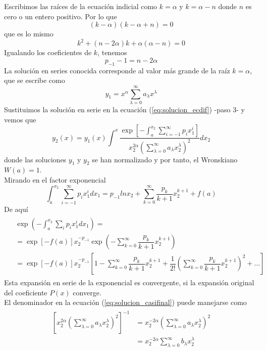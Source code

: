 Escribimos las raíces de la ecuación indicial como $k = \alpha$ y $k= \alpha -n$ donde $n$ es cero o un entero positivo. Por lo que
\begin{equation}
(k - \alpha)(k - \alpha + n) = 0
\end{equation}
que es lo mismo
\[ k^{2} + (n-2\alpha)k + \alpha(\alpha - n) = 0\]
Igualando los coeficientes de $k$, tenemos
\begin{equation}
p_{-1} -1 = n - 2 \alpha
\end{equation}
La solución en series conocida corresponde al valor más grande de la raíz $k=\alpha$, que se escribe como
\[ y_{1} =  x^{\alpha} \sum_{\lambda=0}^{\infty} a_{\lambda} x^{\lambda} \]
Sustituimos la solución en serie en la ecuación (\ref{eq:solucion_ecdif}) -paso 3- y vemos que
\begin{equation}
y_{2}(x) = y_{1} (x) \int^{x} \dfrac{\exp \left[ - \int_{a}^{x_{2}} \sum_{i=-1}^{\infty} p_{i} x^{i}_{1} \right] }{x_{2}^{2\alpha} \left( \sum_{\lambda=0}^\infty a_{\lambda} x_{2}^{\lambda} \right)^{2} } dx_{2} \label{eq:solucion_casifinal}
\end{equation}
donde las soluciones $y_{1}$ y $y_{2}$ se han normalizado y por tanto, el Wronskiano $W(a)=1$. 
\\
Mirando en el factor exponencial
\begin{equation}
\int_{a}^{x_{2}} \sum_{i=-1}^{\infty} p_{i} x_{1}^{i} dx_{1} = p_{-1} ln x_{2} + \sum_{k=0}^{\infty} \dfrac{p_{k}}{k+1} x_{2}^{k+1} + f(a)
\end{equation}
De aquí
\begin{eqnarray}
\begin{aligned}
&{}\exp \left( - \int_{a}^{x_{2}} \sum_{i} p_{i} x_{1}^{i} dx_{1} \right) = \\
&= \exp [ - f(a) ] x_{2}^{-p_{-1}} \exp \left( - \sum_{k=0}^{\infty} \dfrac{p_{k}}{k+1} x_{2}^{k+1} \right) \\
&= \exp [ - f(a) ] x_{2}^{-p_{-1}} \left[ 1 - \sum_{k=0}^{\infty} \dfrac{p_{k}}{k+1} x_{2}^{k+1} + \dfrac{1}{2!} \left( \sum_{k=0}^{\infty} \dfrac{p_{k}}{k+1} x_{2}^{k+1} \right)^{2} + \ldots \right]
\end{aligned}
\end{eqnarray}
Esta expansión en serie de la exponencial es convergente, si la expansión original del coeficiente $P(x)$ converge.
\\El denominador en la ecuación (\ref{eq:solucion_casifinal}) puede manejarse como
\begin{eqnarray}
\begin{aligned}
\left[ x_{2}^{2 \alpha} \left( \sum_{\lambda=0}^{\infty} a_{\lambda} x_{2}^{\lambda} \right)^{2} \right]^{-1} &= x_{2}^{-2 \alpha} \left( \sum_{\lambda=0}^{\infty} a_{\lambda} x_{2}^{\lambda} \right)^{2} \\
&= x_{2}^{-2 \alpha} \sum_{\lambda=0}^{\infty} b_{\lambda} x_{2}^{\lambda}
\end{aligned}
\end{eqnarray}
